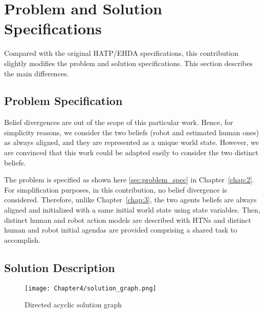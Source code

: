 
\section{Problem and Solution Specifications}

Compared with the original HATP/EHDA specifications, this contribution slightly modifies the problem and solution specifications. This section describes the main differences.

    \subsection*{Problem Specification}

Belief divergences are out of the scope of this particular work. Hence, for simplicity reasons, we consider the two beliefs (robot and estimated human ones) as always aligned, and they are represented as a unique world state. However, we are convinced that this work could be adapted easily to consider the two distinct beliefs.

The problem is specified as shown here \ref{sec:problem_spec} in Chapter~\ref{chap:2}. For simplification purposes, in this contribution, no belief divergence is considered. Therefore, unlike Chapter~\ref{chap:3}, the two agents beliefs are always aligned and initialized with a same initial world state using state variables. Then, distinct human and robot action models are described with HTNs and distinct human and robot initial agendas are provided comprising a shared task to accomplish. 

\subsection*{Solution Description}

\begin{figure}[h]
    \centering
    \texttt{[image: Chapter4/solution\_graph.png]}
    \caption{Directed acyclic solution graph}
    \label{fig:solution_graph}
\end{figure}

